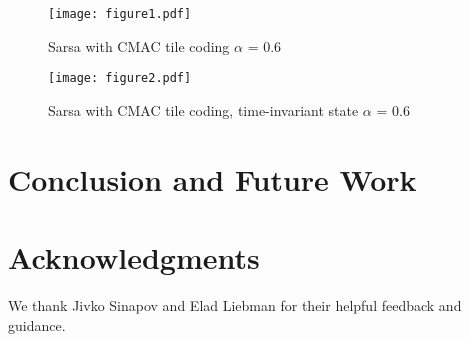 \documentclass{article}
\begin{document}
   	\begin{figure}
        \texttt{[image: figure1.pdf]}
        \caption{Sarsa with CMAC tile coding $\alpha$ = 0.6}
    \end{figure}
    
    \begin{figure}
        \texttt{[image: figure2.pdf]}
        \caption{Sarsa with CMAC tile coding, time-invariant state $\alpha$ = 0.6}
    \end{figure}


	\section{Conclusion and Future Work}

        

    \section{Acknowledgments}
    
    We thank Jivko Sinapov and Elad Liebman for their helpful feedback and guidance.
	{}
	
\end{document}
